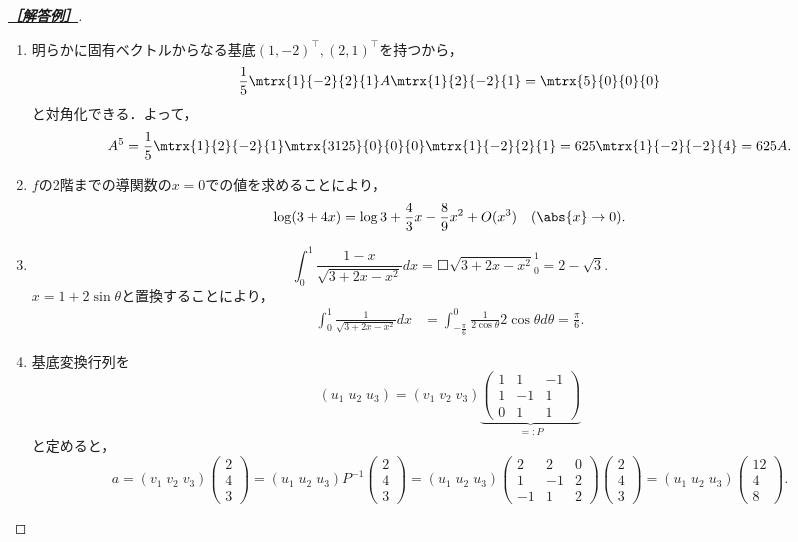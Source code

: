 \documentclass[uplatex,dvipdfmx]{jsarticle}
\begin{document}
\begin{proof}[\textbf{\underline{［解答例］}}]\mbox{}
    \begin{enumerate}
        \item 明らかに固有ベクトルからなる基底$(1,-2)^\top,(2,1)^\top$を持つから，
        \[\frac{1}{5}\mtrx{1}{-2}{2}{1}A\mtrx{1}{2}{-2}{1}=\mtrx{5}{0}{0}{0}\]
        と対角化できる．よって，
        \[A^5=\frac{1}{5}\mtrx{1}{2}{-2}{1}\mtrx{3125}{0}{0}{0}\mtrx{1}{-2}{2}{1}=625\mtrx{1}{-2}{-2}{4}=625A.\]
        \item $f$の2階までの導関数の$x=0$での値を求めることにより，
        \[\log(3+4x)=\log 3+\frac{4}{3}x-\frac{8}{9}x^2+O(x^3)\quad(\abs{x}\to0).\]
        \item \[\int^1_0\frac{1-x}{\sqrt{3+2x-x^2}}dx=\Square{\sqrt{3+2x-x^2}}^1_0=2-\sqrt{3}.\]
        $x=1+2\sin\theta$と置換することにより，
        \begin{align*}
            \int^1_0\frac{1}{\sqrt{3+2x-x^2}}dx&=\int^0_{-\frac{\pi}{6}}\frac{1}{2\cos\theta}2\cos\theta d\theta=\frac{\pi}{6}.
        \end{align*}
        \item 基底変換行列を
        \[(u_1\;u_2\;u_3)=(v_1\;v_2\;v_3)\underbrace{\begin{pmatrix}
            1&1&-1\\1&-1&1\\0&1&1
        \end{pmatrix}}_{=:P}\]
        と定めると，
        \[a=(v_1\;v_2\;v_3)\begin{pmatrix}
            2\\4\\3
        \end{pmatrix}=(u_1\;u_2\;u_3)P^{-1}\begin{pmatrix}
            2\\4\\3
        \end{pmatrix}=(u_1\;u_2\;u_3)\begin{pmatrix}
            2&2&0\\1&-1&2\\-1&1&2
        \end{pmatrix}\begin{pmatrix}
            2\\4\\3
        \end{pmatrix}=(u_1\;u_2\;u_3)\begin{pmatrix}
            12\\4\\8
        \end{pmatrix}.\]
    \end{enumerate}
\end{proof}
\end{document}
